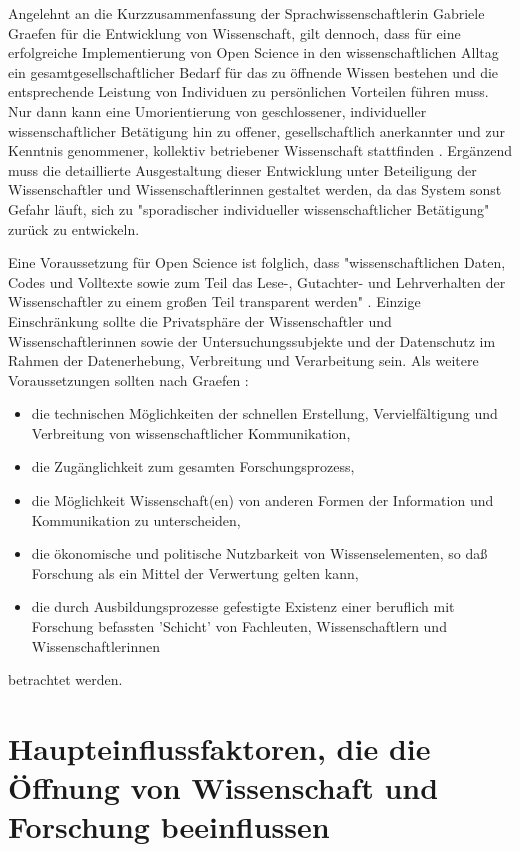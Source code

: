 Angelehnt an die Kurzzusammenfassung der Sprachwissenschaftlerin Gabriele Graefen für die Entwicklung von Wissenschaft, gilt dennoch, dass für eine erfolgreiche Implementierung von Open Science in den wissenschaftlichen Alltag ein gesamtgesellschaftlicher Bedarf für das zu öffnende Wissen bestehen und die entsprechende Leistung von Individuen zu persönlichen Vorteilen führen muss. Nur dann kann eine Umorientierung von geschlossener, individueller wissenschaftlicher Betätigung hin zu offener, gesellschaftlich anerkannter und zur Kenntnis genommener, kollektiv betriebener Wissenschaft stattfinden \cite{Graefen_2007}. Ergänzend muss die detaillierte Ausgestaltung dieser Entwicklung unter Beteiligung der Wissenschaftler und Wissenschaftlerinnen gestaltet werden, da das System sonst Gefahr läuft, sich zu "sporadischer individueller wissenschaftlicher Betätigung" \cite{Graefen_2007} zurück zu entwickeln.

Eine Voraussetzung für Open Science ist folglich, dass "wissenschaftlichen Daten, Codes und Volltexte sowie zum Teil das Lese-, Gutachter- und Lehrverhalten der Wissenschaftler zu einem großen Teil transparent werden" \cite{Brembs_2015}. Einzige Einschränkung sollte die Privatsphäre der Wissenschaftler und Wissenschaftlerinnen sowie der Untersuchungssubjekte und der Datenschutz im Rahmen der Datenerhebung, Verbreitung und Verarbeitung sein. Als weitere Voraussetzungen sollten nach Graefen \cite{Graefen_2007}:
\begin{itemize}
\item die technischen Möglichkeiten der schnellen Erstellung, Vervielfältigung und Verbreitung von wissenschaftlicher Kommunikation,
\item die Zugänglichkeit zum gesamten Forschungsprozess,
\item die Möglichkeit Wissenschaft(en) von anderen Formen der Information und Kommunikation zu unterscheiden,
\item die ökonomische und politische Nutzbarkeit von Wissenselementen, so daß Forschung als ein Mittel der Verwertung gelten kann,
\item die durch Ausbildungsprozesse gefestigte Existenz einer beruflich mit Forschung befassten 'Schicht' von Fachleuten, Wissenschaftlern und Wissenschaftlerinnen
\end{itemize}
betrachtet werden.

\section{Haupteinflussfaktoren, die die Öffnung von Wissenschaft und Forschung beeinflussen}

